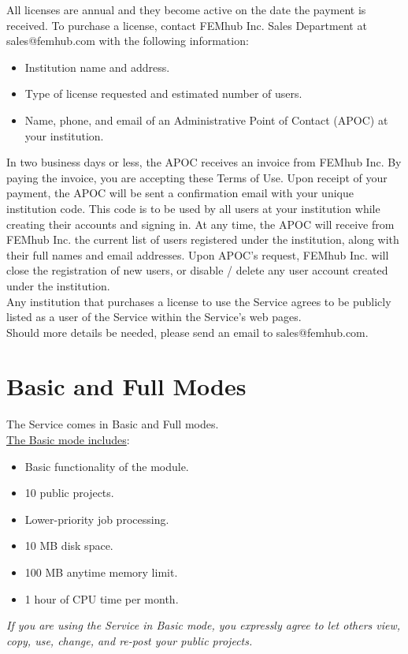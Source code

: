 \documentclass{article}
\begin{document}
All licenses are annual and they become active on the date the payment is received. 
To purchase a license, contact FEMhub Inc. Sales Department at sales@femhub.com with the 
following information:

\begin{itemize}
\item Institution name and address.
\item Type of license requested and estimated number of users.
\item Name, phone, and email of an Administrative Point of Contact (APOC) at your institution.
\end{itemize}
In two business days or less, the APOC receives an invoice from FEMhub Inc. By paying the invoice, you are accepting these Terms of Use. Upon receipt of your payment, the APOC will be sent a confirmation email with your unique institution code. This code is to be used by all users at your institution while creating their accounts and signing in. At any time, the APOC will receive from FEMhub Inc. the current list of users registered under the institution, along with their full names and email addresses. Upon APOC’s request, FEMhub Inc. will close the registration of new users, or disable / delete any user account created under the institution. \\

\noindent
Any institution that purchases a license to use the Service agrees to be 
publicly listed as a user of the Service within the Service’s web pages.\\

\noindent
Should more details be needed, please send an email to sales@femhub.com.

\section*{Basic and Full Modes}

The Service comes in Basic and Full modes. \\

\noindent
\underline{The Basic mode includes}:
\begin{itemize}
\item Basic functionality of the module.
\item 10 public projects. 
\item Lower-priority job processing.
\item 10 MB disk space.
\item 100 MB anytime memory limit.
\item 1 hour of CPU time per month.
\end{itemize}
{\em If you are using the Service in Basic mode, you expressly agree to let others view, 
copy, use, change, and re-post your public projects.} \\
\end{document}
